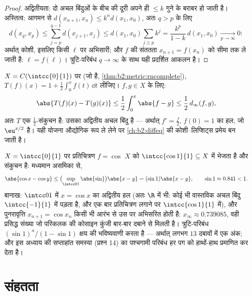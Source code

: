 \begin{proof}
अद्वितीयता: दो अचल बिंदुओं के बीच की दूरी अपने ही $\leq k$ गुने के बराबर हो
जाती है। अस्तित्व: आगमन से $d(x_{n+1}, x_n) \leq k^n d(x_1, x_0)$, अतः $q > p$ के लिए
\[
d(x_q, x_p) \leq \sum_{j=p}^{q-1} d(x_{j+1}, x_j)
\leq d(x_1, x_0) \sum_{j \geq p} k^j
= \frac{k^p}{1-k}\, d(x_1, x_0) \xrightarrow[p\to\infty]{} 0 :
\]
अर्थात् कोशी, इसलिए किसी $\ell$ पर अभिसारी; और $f$ की संततता $x_{n+1} = f(x_n)$ को सीमा
तक ले जाती है: $\ell = f(\ell)$। त्रुटि-परिबंध $q \to \infty$ के साथ यही प्रदर्शित आकलन है।
\end{proof}

\begin{example}[एक समाकल समीकरण]\label{ex:b2:metric:integralequation}
$X = C(\intcc{0}{1})$ पर (जो  है, \cref{thm:b2:metric:rncomplete}), $T(f)(x) = 1 + \frac12
\int_0^x f(t)\,\dd t$ लीजिए। $f, g \in X$ के लिए:
\[
\abs{T(f)(x) - T(g)(x)} \leq \frac12 \int_0^x \abs{f - g} \leq
\frac12\, d_\infty(f, g),
\]
अतः $T$ एक $\frac12$-संकुचन है: उसका अद्वितीय  अचल बिंदु है --- अर्थात्
$f' = \frac f2$, $f(0) = 1$ का हल, जो $\eu^{x/2}$ है। यही योजना औद्योगिक रूप ले लेने पर \cref{ch:b2:diffeq} की
कोशी--लिप्शिट्स प्रमेय बन जाती है।
\end{example}

\begin{example}[एक संख्यात्मक अचल बिंदु: $x = \cos x$]\label{ex:b2:metric:cosfix}
 $X = \intcc{0}{1}$ पर प्रतिचित्रण $f = \cos$ $X$ को $\intcc{\cos 1}{1} \subseteq X$ में भेजता है और संकुचन है:
मध्यमान असमिका से,
\[
\abs{\cos x - \cos y} \leq \bigl(\sup_{\intcc01}\abs{\sin}\bigr)
\abs{x - y} = (\sin 1)\abs{x - y},
\qquad \sin 1 \approx 0.841 < 1 .
\]
बानाख: $\intcc01$ में $x = \cos x$ का अद्वितीय हल (अतः $\R$ में भी: कोई भी वास्तविक अचल
बिंदु $\intcc{-1}{1}$ में पड़ता है, और एक बार प्रतिचित्रण लगाने पर $\intcc{\cos 1}{1}$ में), और
पुनरावृत्ति $x_{n+1} = \cos x_n$ किसी भी आरंभ से उस पर अभिसरित होती है: $x_\infty
\approx 0.739085$, वही
प्रसिद्ध संख्या जो परिकलक की कोसाइन कुंजी बार-बार दबाने से मिलती है।
त्रुटि-परिबंध $(\sin1)^n/(1 - \sin1)$ क्षय की भविष्यवाणी करता है --- अर्थात् लगभग $13$
दबावों में एक अंक; और इस अध्याय की सप्ताहांत समस्या (प्रश्न 14) का
पश्चगामी परिबंध हर पग को हाथों-हाथ प्रमाणित कर देता है।
\end{example}

\section{संहतता}

